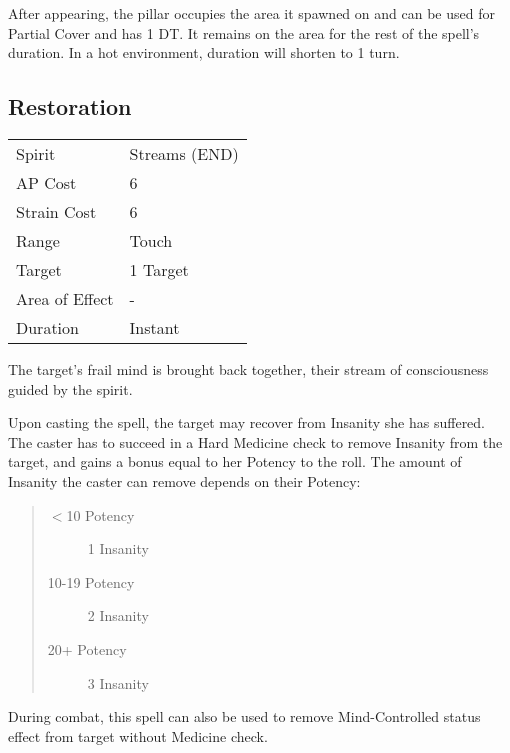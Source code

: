 \documentclass[11pt,a4paper,twocolumn]{book}
\begin{document}
After appearing, the pillar occupies the area it spawned on and can be used for Partial Cover and has 1 DT. It remains on the area for the rest of the spell's duration. In a hot environment, duration will shorten to 1 turn.

\subsection*{Restoration}
{
	\begin{tabu} to 75mm{| X[l,4] | X[l,7] |}
		\hline
		Spirit 			& Streams (END) 		\\
		AP Cost	      	& 6 					\\
		Strain Cost     & 6 					\\
		Range     		& Touch					\\
		Target      	& 1 Target				\\
		Area of Effect  & -  	 				\\
		Duration     	& Instant				\\ \hline
	\end{tabu}
	
}

\medskip

The target's frail mind is brought back together, their stream of consciousness guided by the spirit.

Upon casting the spell, the target may recover from Insanity she has suffered. The caster has to succeed in a Hard Medicine check to remove Insanity from the target, and gains a bonus equal to her Potency to the roll. The amount of Insanity the caster can remove depends on their Potency:

\begin{quote}
	\begin{description}
		\item[$<$10 Potency] 	1 Insanity
		\item[10-19 Potency] 	2 Insanity
		\item[20+ Potency] 	    3 Insanity	
	\end{description}	
\end{quote}

During combat, this spell can also be used to remove Mind-Controlled status effect from target without Medicine check.
\end{document}
